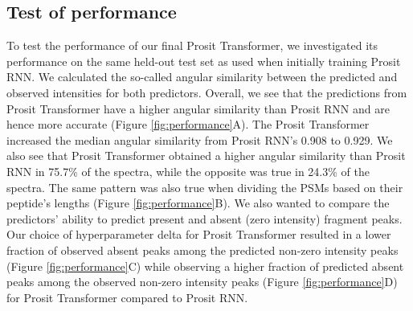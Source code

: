\documentclass[10pt,a4paper]{article}
\begin{document}
\subsection*{Test of performance}

To test the performance of our final Prosit Transformer, we investigated its performance on the same held-out test set as used when initially training Prosit RNN. We calculated the so-called angular similarity between the predicted and observed intensities for both predictors. Overall, we see that the predictions from Prosit Transformer have a higher angular similarity than Prosit RNN and are hence more accurate (Figure \ref{fig:performance}A). The Prosit Transformer increased the median angular similarity from Prosit RNN’s 0.908 to 0.929. We also see that Prosit Transformer obtained a higher angular similarity than Prosit RNN in 75.7\% of the spectra, while the opposite was true in 24.3\% of the spectra. The same pattern was also true when dividing the PSMs based on their peptide’s lengths (Figure \ref{fig:performance}B). We also wanted to compare the predictors’ ability to predict present and absent (zero intensity) fragment peaks.  Our choice of hyperparameter delta for Prosit Transformer resulted in a lower fraction of observed absent peaks among the predicted non-zero intensity peaks (Figure \ref{fig:performance}C) while observing a higher fraction of predicted absent peaks among the observed non-zero intensity peaks (Figure \ref{fig:performance}D) for Prosit Transformer compared to Prosit RNN.
\end{document}
